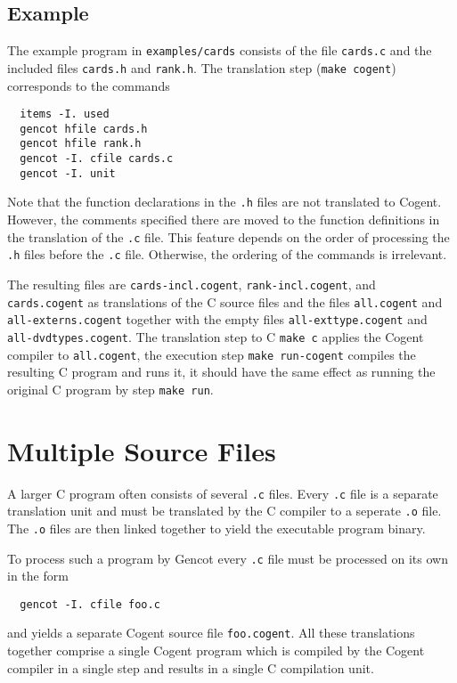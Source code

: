 \documentclass[a4paper]{report}
\newcommand{\code}[1]{\textnormal{\texttt{#1}}}
\begin{document}
\subsection{Example}

The example program in \code{examples/cards} consists of the file \code{cards.c} and the included files \code{cards.h}
and \code{rank.h}. The translation step (\code{make cogent}) corresponds to the commands
\begin{verbatim}
  items -I. used
  gencot hfile cards.h
  gencot hfile rank.h
  gencot -I. cfile cards.c
  gencot -I. unit
\end{verbatim}

Note that the function declarations in the \code{.h} files are not translated to Cogent. However, the comments specified 
there are moved to the function definitions in the translation of the \code{.c} file. This feature depends on the order of
processing the \code{.h} files before the \code{.c} file. Otherwise, the ordering of the commands is irrelevant.

The resulting files are \code{cards-incl.cogent}, \code{rank-incl.cogent}, and \code{cards.cogent} as translations of the
C source files and the files \code{all.cogent} and \code{all-externs.cogent} together with the empty files \code{all-exttype.cogent}
and \code{all-dvdtypes.cogent}. The translation step to C \code{make c} applies the Cogent compiler to \code{all.cogent},
the execution step \code{make run-cogent} compiles the resulting C program and runs it, it should have the same effect
as running the original C program by step \code{make run}.

\section{Multiple Source Files}
\label{struct-multi}

A larger C program often consists of several \code{.c} files. Every \code{.c} file is a separate translation unit and
must be translated by the C compiler to a seperate \code{.o} file. The \code{.o} files are then linked together to
yield the executable program binary.

To process such a program by Gencot every \code{.c} file must be processed on its own in the form
\begin{verbatim}
  gencot -I. cfile foo.c
\end{verbatim}
and yields a separate Cogent source file \code{foo.cogent}. All these translations together comprise a single
Cogent program which is compiled by the Cogent compiler in a single step and results in a single C compilation unit.
\end{document}
